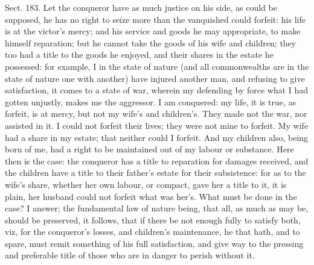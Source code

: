 \documentclass[11pt,openany]{book}
\begin{document}
Sect. 183. Let the conqueror have as much justice on his side, as could be supposed, he has no right to seize more than the vanquished could forfeit: his life is at the victor's mercy; and his service and goods he may appropriate, to make himself reparation; but he cannot take the goods of his wife and children; they too had a title to the goods he enjoyed, and their shares in the estate he possessed: for example, I in the state of nature (and all commonwealths are in the state of nature one with another) have injured another man, and refusing to give satisfaction, it comes to a state of war, wherein my defending by force what I had gotten unjustly, makes me the aggressor. I am conquered: my life, it is true, as forfeit, is at mercy, but not my wife's and children's. They made not the war, nor assisted in it. I could not forfeit their lives; they were not mine to forfeit. My wife had a share in my estate; that neither could I forfeit. And my children also, being born of me, had a right to be maintained out of my labour or substance. Here then is the case: the conqueror has a title to reparation for damages received, and the children have a title to their father's estate for their subsistence: for as to the wife's share, whether her own labour, or compact, gave her a title to it, it is plain, her husband could not forfeit what was her's. What must be done in the case? I answer; the fundamental law of nature being, that all, as much as may be, should be preserved, it follows, that if there be not enough fully to satisfy both, viz, for the conqueror's losses, and children's maintenance, he that hath, and to spare, must remit something of his full satisfaction, and give way to the pressing and preferable title of those who are in danger to perish without it.
\end{document}

